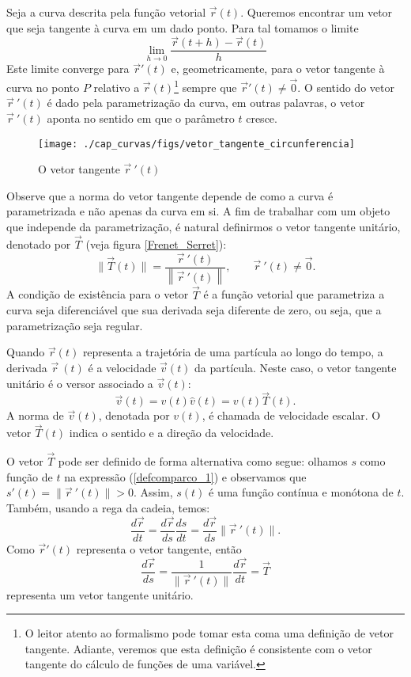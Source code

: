 Seja a curva descrita pela função vetorial $\vec{r}(t)$. Queremos encontrar um vetor que seja tangente à curva em um dado ponto. Para tal tomamos o limite
$$\lim_{h\to 0} \frac{\vec{r}(t+h)-\vec{r}(t)}{h}$$  
Este limite converge para $\vec{r}'(t)$ e, geometricamente, para o vetor tangente à curva no ponto $P$ relativo a $\vec{r}(t)$\footnote{O leitor atento ao formalismo pode tomar esta coma uma definição de vetor tangente. Adiante, veremos que esta definição é consistente com o vetor tangente do cálculo de funções de uma variável.} sempre que $\vec{r}'(t)\neq \vec{0}$. O sentido do vetor $\vec{r}~\!'(t)$ é dado pela parametrização da curva, em outras palavras, o vetor $\vec{r}~\!'(t)$ aponta no sentido em que o parâmetro $t$ cresce.


\begin{figure}%
\begin{center}
    \texttt{[image: ./cap\_curvas/figs/vetor\_tangente\_circunferencia]}
\caption{O vetor tangente $\vec{r}\!~'(t)$}\label{circtang}
  \end{center}
\end{figure}


Observe que a norma do vetor tangente depende de como a curva é parametrizada e não apenas da curva em si. A fim de trabalhar com um objeto que independe da parametrização, é natural definirmos o vetor tangente unitário, denotado por $\vec{T}$ (veja figura \ref{Frenet_Serret}):
\begin{equation}\label{defvecunit}
\|\vec{T}(t)\|=\frac{\vec{r}\!~'(t)}{\left\|\vec{r}\!~'(t)\right\|},\qquad \vec{r}\!~'(t)\neq \vec{0}.
\end{equation} 
A condição de existência para o vetor $\vec{T}$ é a função vetorial que parametriza a curva seja diferenciável que sua derivada seja diferente de zero, ou seja, que a parametrização seja regular.

\begin{obs} Quando $\vec{r}(t)$ representa a trajetória de uma partícula ao longo do tempo, a derivada $\vec{r}\!~(t)$ é a velocidade $\vec{v}(t)$ da partícula. Neste caso, o vetor tangente unitário é o versor associado a $\vec{v}(t)$:
$$\vec{v}(t)=v(t) \hat{v}(t)=v(t) \vec{T}(t).$$
A norma de $\vec{v}(t)$, denotada por $v(t)$, é chamada de velocidade escalar. O vetor $\vec{T}(t)$ indica o sentido e a direção da velocidade.
\end{obs}

O vetor $\vec{T}$ pode ser definido de forma alternativa como segue: olhamos $s$ como função de $t$ na expressão (\ref{defcomparco_1}) e observamos que $s'(t)=\|\vec{r}\!~'(t)\|>0$. Assim, $s(t)$ é uma função contínua e monótona de $t$. Também, usando a rega da cadeia, temos:
$$
\frac{d\vec{r}}{dt}=\frac{d\vec{r}}{ds}\frac{ds}{dt}=\frac{d\vec{r}}{ds}\|\vec{r}\!~'(t)\|.
$$
Como $\vec{r}'(t)$ representa o vetor tangente, então
$$
\frac{d\vec{r}}{ds}=\frac{1}{\|\vec{r}\!~'(t)\|}\frac{d\vec{r}}{dt}=\vec{T}
$$
representa um vetor tangente unitário.


